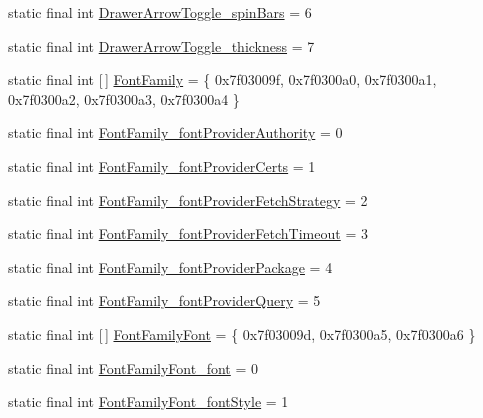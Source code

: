 \begin{DoxyCompactItemize}
static final int \mbox{\hyperlink{classandroid_1_1support_1_1v7_1_1appcompat_1_1R_1_1styleable_a93a75bb35b9128705ac454ab5390f384}{Drawer\+Arrow\+Toggle\+\_\+spin\+Bars}} = 6
\item 
static final int \mbox{\hyperlink{classandroid_1_1support_1_1v7_1_1appcompat_1_1R_1_1styleable_a4c29e2305386cfb011ab7da889aeae29}{Drawer\+Arrow\+Toggle\+\_\+thickness}} = 7
\item 
static final int \mbox{[}$\,$\mbox{]} \mbox{\hyperlink{classandroid_1_1support_1_1v7_1_1appcompat_1_1R_1_1styleable_a6de611067e40bc66c1948fd0cf299028}{Font\+Family}} = \{ 0x7f03009f, 0x7f0300a0, 0x7f0300a1, 0x7f0300a2, 0x7f0300a3, 0x7f0300a4 \}
\item 
static final int \mbox{\hyperlink{classandroid_1_1support_1_1v7_1_1appcompat_1_1R_1_1styleable_a2551421beec3a2a901708473ad82f5d5}{Font\+Family\+\_\+font\+Provider\+Authority}} = 0
\item 
static final int \mbox{\hyperlink{classandroid_1_1support_1_1v7_1_1appcompat_1_1R_1_1styleable_a019726e636a88a71481fe7449242b56d}{Font\+Family\+\_\+font\+Provider\+Certs}} = 1
\item 
static final int \mbox{\hyperlink{classandroid_1_1support_1_1v7_1_1appcompat_1_1R_1_1styleable_ad76e6435a886393de355c01073f08bb5}{Font\+Family\+\_\+font\+Provider\+Fetch\+Strategy}} = 2
\item 
static final int \mbox{\hyperlink{classandroid_1_1support_1_1v7_1_1appcompat_1_1R_1_1styleable_ab4af48164430583c13f7385941854c70}{Font\+Family\+\_\+font\+Provider\+Fetch\+Timeout}} = 3
\item 
static final int \mbox{\hyperlink{classandroid_1_1support_1_1v7_1_1appcompat_1_1R_1_1styleable_aa71250d89aba0fe33311fd2628342aad}{Font\+Family\+\_\+font\+Provider\+Package}} = 4
\item 
static final int \mbox{\hyperlink{classandroid_1_1support_1_1v7_1_1appcompat_1_1R_1_1styleable_abe35be4821e4580533c65cfc02749d61}{Font\+Family\+\_\+font\+Provider\+Query}} = 5
\item 
static final int \mbox{[}$\,$\mbox{]} \mbox{\hyperlink{classandroid_1_1support_1_1v7_1_1appcompat_1_1R_1_1styleable_a1f963633c060aeae0010f3d9d21be0d9}{Font\+Family\+Font}} = \{ 0x7f03009d, 0x7f0300a5, 0x7f0300a6 \}
\item 
static final int \mbox{\hyperlink{classandroid_1_1support_1_1v7_1_1appcompat_1_1R_1_1styleable_ab8d3ad7dacf5b910fe3c786a0eff7871}{Font\+Family\+Font\+\_\+font}} = 0
\item 
static final int \mbox{\hyperlink{classandroid_1_1support_1_1v7_1_1appcompat_1_1R_1_1styleable_a87b0431997ee6431543e190e93be3ce3}{Font\+Family\+Font\+\_\+font\+Style}} = 1

\end{DoxyCompactItemize}
